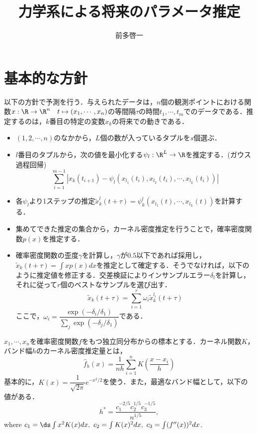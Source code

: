 \documentclass{jsarticle}
\title{力学系による将来のパラメータ推定}
\author{前多啓一}
\begin{document}
\maketitle


\section{基本的な方針}
\begin{rem}[方針]
 以下の方針で予測を行う．与えられたデータは，$n$個の観測ポイントにおける関数$x:\R\to\R^n\quad t\mapsto(x_1,\cdots,x_n)$の等間隔$\tau$の時間$t_1,\cdots,t_m$でのデータである．推定するのは，$k$番目の特定の変数$x_k$の将来での動きである．
\begin{itemize}
 \item $(1,2,\cdots, n)$のなかから，$L$個の数が入っているタプルを$s$個選ぶ．
 \item $l$番目のタプルから，次の値を最小化する$\psi_l:\R^L\to\R$を推定する．(ガウス過程回帰)
       \[
	\sum_{i=1}^{m-1}|x_k(t_{i+1}) -\psi_l(x_{l_1}(t_i),x_{l_2}(t_i),\cdots,x_{l_L}(t_i))|
       \]
 \item 各$\psi_l$より1ステップの推定$\tilde{x}_k^l(t+\tau)=\psi_k^l(x_{l_1}(t),\cdots,x_{l_L}(t))$を計算する．
 \item 集めてできた推定の集合から，カーネル密度推定を行うことで，確率密度関数$p(x)$を推定する．
 \item 確率密度関数の歪度$\gamma$を計算し，$\gamma$が$0.5$以下であれば採用し，$\tilde{x}_k(t+\tau)=\int xp(x)dx$を推定として確定する．そうでなければ，以下のように推定値を修正する．交差検証によりインサンプルエラー$\delta_l$を計算し，それに従って$r$個のベストなサンプルを選び出す．
       \[
	\tilde{x}_k(t+\tau)=\sum_{i=1}^r\omega_i\tilde{x}_{k}^{l_i}(t+\tau)
       \]
       ここで，$\omega_{i}=\dfrac{\exp(-\delta_i/\delta_1)}{\sum_j\exp(-\delta_j/\delta_1)}$である．
\end{itemize} 
\end{rem}

\begin{defi}[カーネル密度推定]
$x_1,\cdots,x_n$を確率密度関数$f$をもつ独立同分布からの標本とする．カーネル関数$K$，バンド幅$h$のカーネル密度推定量とは，
\[
\hat{f}_h(x)=\dfrac{1}{nh}\sum_{i=1}^n K\left(\dfrac{x-x_i}{h}\right)
\]
基本的に，$K(x)=\dfrac{1}{\sqrt{2\pi}}e^{-x^2/2}$を使う．また，最適なバンド幅として，以下の値がある．
\[
h^*=\dfrac{c_1^{-2/5}c_2^{1/5}c_3^{-1/5}}{n^{1/5}},
\]
where $c_1=\ds\int x^2K(x)dx,\ c_2=\int K(x)^2dx,\ c_3=\int(f''(x))^2dx$.
\end{defi}
\end{document}

